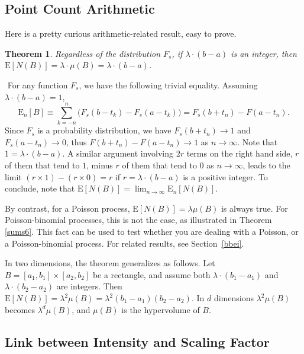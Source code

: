 \documentclass[10pt]{article}
\newtheorem{theorem}{Theorem}[section]
\newenvironment{proof}[1][Proof]{\begin{trivlist}
\item[\hskip \labelsep {\bfseries #1}]}{\end{trivlist}}
\newcommand{\qed}{\nobreak \ifvmode \relax \else
      \ifdim\lastskip<1.5em \hskip-\lastskip
      \hskip1.5em plus0em minus0.5em \fi \nobreak
      \vrule height0.75em width0.5em depth0.25em\fi}
\begin{document}
\subsection{Point Count Arithmetic}\label{pca23}

Here is a pretty curious arithmetic-related result, easy to prove.

\begin{theorem}
\label{combiexp}
Regardless of the distribution $F_s$, if $\lambda\cdot(b-a)$ is an integer, then $\mbox{E}[N(B)]=\lambda\cdot\mu(B)=\lambda\cdot(b-a)$.
\end{theorem}
\begin{proof}
$ $ \newline 
For any function $F_s$, we have the following trivial equality. Assuming $\lambda\cdot(b-a)=1$, 
$$\mbox{E}_n[B]\equiv \sum_{k=-n}^n \Big(F_s(b-t_k)-F_s(a-t_k)\Big)=F_s(b+t_n)-F(a-t_n).$$
Since $F_s$ is a probability distribution, we have $F_s(b+t_n)\rightarrow 1$ and $F_s(a-t_n)\rightarrow 0$, thus $F(b+t_n)-F(a-t_n)\rightarrow 1$ as $n\rightarrow\infty$. Note that $1=\lambda\cdot(b-a)$. A similar argument involving $2r$ terms on the right hand side, $r$ of them that tend to $1$, minus $r$ of them that tend to $0$ as $n\rightarrow\infty$, leads to the limit $(r\times 1) - (r \times 0) = r$ if $r=\lambda\cdot(b-a)$ is a positive integer. To conclude, note that $\mbox{E}[N(B)]=\lim_{n\rightarrow\infty} \mbox{E}_n[N(B)]$. \qed
\end{proof}

By contrast, for a Poisson process, $\mbox{E}[N(B)]=\lambda\mu(B)$ is always true. For Poisson-binomial processes, this is not the case, as illustrated in Theorem \ref{sums6}. This fact can be used to test whether you are dealing with a Poisson, or a Poisson-binomial process. For related results, see Section~\ref{bbei}.

In two dimensions, the theorem generalizes as follows. Let $B=[a_1, b_1] \times [a_2, b_2]$ be a rectangle, and assume both $\lambda\cdot(b_1-a_1)$ and  $\lambda\cdot(b_2-a_2)$ are integers.
Then $\mbox{E}[N(B)]=\lambda^2\mu(B)=\lambda^2(b_1-a_1)(b_2-a_2)$. In $d$ dimensions $\lambda^2\mu(B)$ becomes
$\lambda^d\mu(B)$,  and $\mu(B)$ is the hypervolume of $B$.

\subsection{Link between Intensity and Scaling Factor}\label{liisc}
\end{document}
